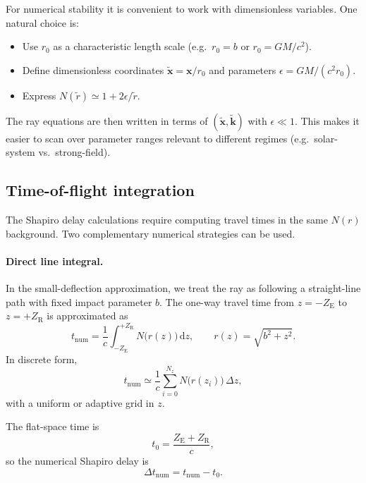 \documentclass[11pt]{article}
\begin{document}
For numerical stability it is convenient to work with dimensionless
variables.
One natural choice is:

\begin{itemize}
  \item Use $r_0$ as a characteristic length scale (e.g.\ $r_0 = b$ or
        $r_0 = GM/c^2$).
  \item Define dimensionless coordinates
        $\tilde{\mathbf{x}} = \mathbf{x}/r_0$ and parameters
        $\epsilon = GM/(c^2 r_0)$.
  \item Express $N(\tilde{r}) \simeq 1 + 2\epsilon/\tilde{r}$.
\end{itemize}

The ray equations are then written in terms of $(\tilde{\mathbf{x}},
\tilde{\mathbf{k}})$ with $\epsilon\ll1$.
This makes it easier to scan over parameter ranges relevant to different
regimes (e.g.\ solar-system vs.\ strong-field).


\subsection{Time-of-flight integration}
\label{subsec:app-tof}

The Shapiro delay calculations require computing travel times in the same
$N(r)$ background.
Two complementary numerical strategies can be used.

\paragraph{Direct line integral.}

In the small-deflection approximation, we treat the ray as following a
straight-line path with fixed impact parameter $b$.
The one-way travel time from $z=-Z_\mathrm{E}$ to $z=+Z_\mathrm{R}$ is
approximated as
\begin{equation}
  t_\mathrm{num}
  = \frac{1}{c}\int_{-Z_\mathrm{E}}^{+Z_\mathrm{R}}
     N\bigl(r(z)\bigr)\,\mathrm{d}z,
  \qquad
  r(z) = \sqrt{b^2 + z^2}.
\end{equation}
In discrete form,
\begin{equation}
  t_\mathrm{num}
  \simeq \frac{1}{c}\sum_{i=0}^{N_z} N\bigl(r(z_i)\bigr)\,\Delta z,
\end{equation}
with a uniform or adaptive grid in $z$.

The flat-space time is
\begin{equation}
  t_0
  = \frac{Z_\mathrm{E} + Z_\mathrm{R}}{c},
\end{equation}
so the numerical Shapiro delay is
\begin{equation}
  \Delta t_\mathrm{num}
  = t_\mathrm{num} - t_0.
\end{equation}
\end{document}
